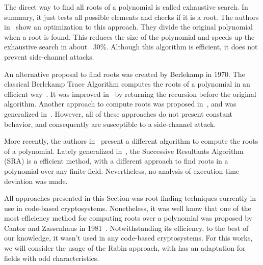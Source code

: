 The direct way to find all roots of a polynomial is called exhaustive search. In summary, it just tests all possible elements and checks if it is a root. The authors in~\cite{strenzke2012fast} show an optimization to this approach. They divide the original polynomial when a root is found. This reduces the size of the polynomial and speeds up the exhaustive search in about ~30\%. Although this algorithm is efficient, it does not prevent side-channel attacks.

An alternative proposal to find roots was created by Berlekamp in 1970. The classical Berlekamp Trace Algorithm computes the roots of a polynomial in an efficient way~\cite{berlekamp1970factoring}. It was improved in~\cite{strenzke2012fast} by returning the recursion before the original algorithm. Another approach to compute roots was proposed in~\cite{fedorenko2002finding}, and was generalized in~\cite{Skachek2008,biswas2009}. However, all of these approaches do not present constant behavior, and consequently are susceptible to a side-channel attack.

More recently, the authors in~\cite{petit2014finding} present a different algorithm to compute the roots of a polynomial. Lately generalized in~\cite{petit2016finding}, the Successive Resultants Algorithm (SRA) is a efficient method, with a different approach to find roots in a polynomial over any finite field. Nevertheless, no analysis of execution time deviation was made.

All approaches presented in this Section was root finding techniques currently in use in code-based cryptosystems. Nonetheless, it was well know that one of the most efficiency method for computing roots over a polynomial was proposed by Cantor and Zassenhaus in 1981~\cite{cantor1981new}. Notwithstanding its efficiency, to the best of our knowledge, it wasn't used in any code-based cryptosystems. For this works, we will consider the usage of the Rabin approach, with has an adaptation for fields with odd characteristics.